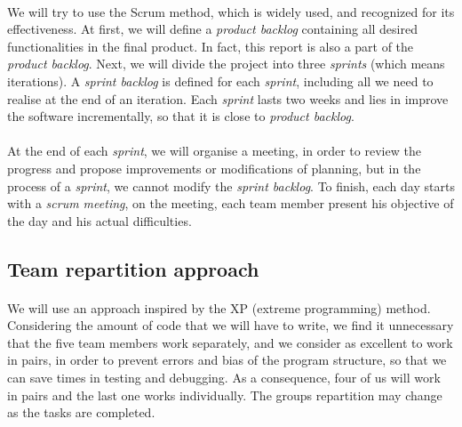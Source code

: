 \documentclass{report}
\begin{document}
\paragraph{}
\hspace{4mm}\textnormal{We will try to use the Scrum method, which is widely used, and recognized for its effectiveness. At first, we will define a \textit{product backlog} containing all desired functionalities in the final product. In fact, this report is also a part of the \textit{product backlog}. 
Next, we will divide the project into three \textit{sprints} (which means iterations). A \textit{sprint backlog} is defined for each \textit{sprint}, including all we need to realise at the end of an iteration. Each \textit{sprint} lasts two weeks and lies in improve the software 
incrementally, so that it is close to \textit{product backlog}.}

\paragraph{}
\hspace{4mm}\textnormal{At the end of each \textit{sprint}, we will organise a meeting, in order to review the progress and propose improvements or modifications of planning,
 but in the process of a \textit{sprint}, we cannot modify the \textit{sprint backlog}. 
To finish, each day starts with a \textit{scrum meeting}, on the meeting, each 
team member present his objective of the day and his actual difficulties.}

\subsection{Team repartition approach}

\paragraph{}
\hspace{4mm}\textnormal{We will use an approach inspired by the XP (extreme programming) method. 
Considering the amount of code that we will have to write, we find it unnecessary that the five team members work separately, 
and we consider as excellent to work in pairs, in order to prevent errors and bias 
of the program structure, so that we can save times in testing and debugging. 
As a consequence, four of us will work in pairs and the last one works individually. The groups repartition
may change as the tasks are completed.}
\end{document}
